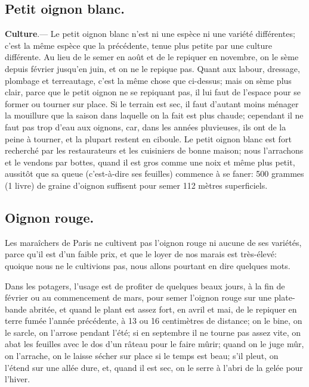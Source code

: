 \documentclass[10pt,a4paper]{book}
\begin{document}
\subsection{Petit oignon blanc.}

\textbf{Culture}.--- Le petit oignon blanc n'est ni une espèce ni une variété différentes; c'est la même espèce que la précédente, tenue plus petite par une culture différente. Au lieu de le semer en août et de le repiquer en novembre, on le sème depuis février jusqu'en juin, et on ne le repique pas. Quant aux labour, dressage, plombage et terreautage, c'est la même chose que ci-dessus; mais on sème plus clair, parce que le petit oignon ne se repiquant pas, il lui faut de l'espace pour se former ou tourner sur place. Si le terrain est sec, il faut d'autant moins ménager la mouillure que la saison dans laquelle on la fait est plus chaude; cependant il ne faut pas trop d'eau aux oignons, car, dans les années pluvieuses, ils ont de la peine à tourner, et la plupart restent en ciboule. Le petit oignon blanc est fort recherché par les restaurateurs et les cuisiniers de bonne maison; nous l'arrachons et le vendons par bottes, quand il est gros comme une noix et même plus petit, aussitôt que sa queue (c'est-à-dire ses feuilles) commence à se faner: 500 grammes (1 livre) de graine d'oignon suffisent pour semer 112 mètres superficiels.

\subsection{Oignon rouge.}

Les maraîchers de Paris ne cultivent pas l'oignon rouge ni aucune de ses variétés, parce qu'il est d'un faible prix, et que le loyer de nos marais est très-élevé: quoique nous ne le cultivions pas, nous allons pourtant en dire quelques mots.

Dans les potagers, l'usage est de profiter de quelques beaux jours, à la fin de février ou au commencement de mars, pour semer l'oignon rouge sur une plate-bande abritée, et quand le plant est assez fort, en avril et mai, de le repiquer en terre fumée l'année précédente, à 13 ou 16 centimètres de distance; on le bine, on le sarcle, on l'arrose pendant l'été; si en septembre il ne tourne pas assez vite, on abat les feuilles avec le dos d'un râteau pour le faire mûrir; quand on le juge mûr, on l'arrache, on le laisse sécher sur place si le temps est beau; s'il pleut, on l'étend sur une allée dure, et, quand il est sec, on le serre à l'abri de la gelée pour l'hiver.
\end{document}
